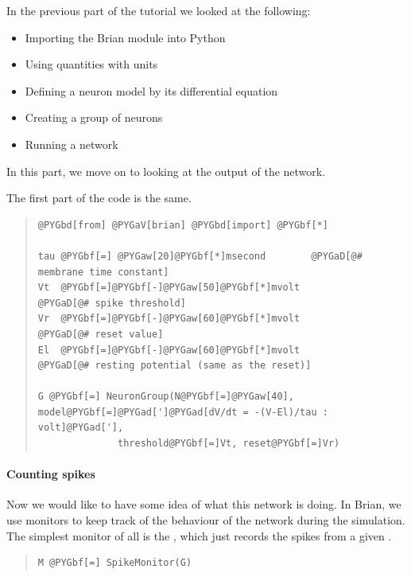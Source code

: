 \documentclass[letterpaper,10pt,english]{manual}
\begin{document}
In the previous part of the tutorial we looked at the following:
\begin{itemize}
\item {} 
Importing the Brian module into Python

\item {} 
Using quantities with units

\item {} 
Defining a neuron model by its differential equation

\item {} 
Creating a group of neurons

\item {} 
Running a network

\end{itemize}

In this part, we move on to looking at the output of the network.

The first part of the code is the same.
\begin{quote}

\begin{Verbatim}[commandchars=@\[\]]
@PYGbd[from] @PYGaV[brian] @PYGbd[import] @PYGbf[*]

tau @PYGbf[=] @PYGaw[20]@PYGbf[*]msecond        @PYGaD[@# membrane time constant]
Vt  @PYGbf[=]@PYGbf[-]@PYGaw[50]@PYGbf[*]mvolt          @PYGaD[@# spike threshold]
Vr  @PYGbf[=]@PYGbf[-]@PYGaw[60]@PYGbf[*]mvolt          @PYGaD[@# reset value]
El  @PYGbf[=]@PYGbf[-]@PYGaw[60]@PYGbf[*]mvolt          @PYGaD[@# resting potential (same as the reset)]

G @PYGbf[=] NeuronGroup(N@PYGbf[=]@PYGaw[40], model@PYGbf[=]@PYGad[']@PYGad[dV/dt = -(V-El)/tau : volt]@PYGad['],
              threshold@PYGbf[=]Vt, reset@PYGbf[=]Vr)
\end{Verbatim}
\end{quote}


\paragraph{Counting spikes}

Now we would like to have some idea of what this network is
doing. In Brian, we use monitors to keep track of the behaviour
of the network during the simulation. The simplest monitor of
all is the \hyperlink{brian.SpikeMonitor}{}, which just records the spikes from a
given \hyperlink{brian.NeuronGroup}{}.
\begin{quote}

\begin{Verbatim}[commandchars=@\[\]]
M @PYGbf[=] SpikeMonitor(G)
\end{Verbatim}
\end{quote}
\end{document}
